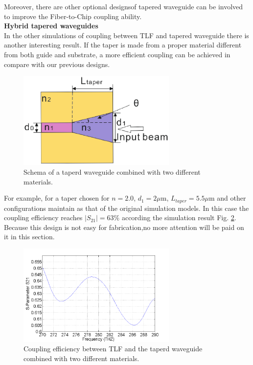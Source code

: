Moreover, there are other optional designsof tapered waveguide can be involved to improve the Fiber-to-Chip coupling ability.\\
\textbf{Hybrid tapered waveguides}\\  
In the other simulations of coupling between TLF and tapered waveguide there is another interesting result. If the taper is made from a proper material different from both guide and substrate, a more efficient coupling can be achieved in compare with our previous designs. 
\begin{figure}[!ht]
\centering
\includegraphics[width=0.7\textwidth]{bilder/tapered_waveguide_others}
\caption{Schema of a taperd waveguide combined with two different materials.}
\label{fig:tapered_waveguide_others}
\end{figure}
For example, for a taper chosen for $n=2.0$, $d_{1}=2\mu$m, $L_{taper}=5.5\mu$m and other configurations maintain as that of the original simulation models. In this case the coupling efficiency reaches $|S_{21}|=63\%$ according the simulation result Fig. \ref{fig:tapered_waveguide_others_coupling}.  Because this design is not easy for fabrication,no more attention will be paid on it in this section.   
\begin{figure}[!ht]
\centering
\includegraphics[width=0.7\textwidth]{bilder/s21_tapered_waveguide_others}
\caption{Coupling efficiency between TLF and the taperd waveguide combined with two different materials.}
\label{fig:tapered_waveguide_others_coupling}
\end{figure}


